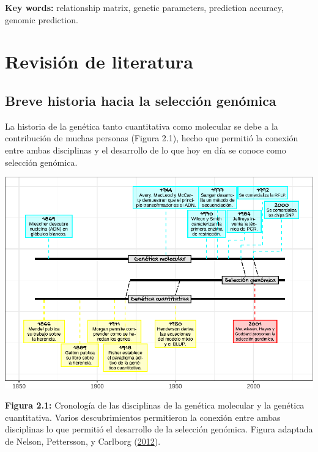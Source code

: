 \documentclass[11pt,spanish,a4paper,oneside,]{book} %
\begin{document}
\hspace*{1em}

\noindent 
\textbf{Key words:} relationship matrix, genetic parameters, prediction accuracy, genomic prediction.

\newpage

\hypertarget{revisiuxf3n-de-literatura}{%
\chapter{Revisión de literatura}\label{revisiuxf3n-de-literatura}}

\hypertarget{breve-historia-hacia-la-selecciuxf3n-genuxf3mica}{%
\section{Breve historia hacia la selección genómica}\label{breve-historia-hacia-la-selecciuxf3n-genuxf3mica}}

La historia de la genética tanto cuantitativa como molecular se debe a la contribución de muchas personas (Figura 2.1), hecho que permitió la conexión entre ambas disciplinas y el desarrollo de lo que hoy en día se conoce como selección genómica.

\begin{center}\includegraphics[width=1\linewidth]{figures/Crono_2} \end{center}

\noindent 
\textbf{Figura 2.1:} Cronología de las disciplinas de la genética molecular y la genética cuantitativa. Varios descubrimientos permitieron la conexión entre ambas disciplinas lo que permitió el desarrollo de la selección genómica. Figura adaptada de Nelson, Pettersson, y Carlborg (\protect\hyperlink{ref-cite:2}{2012}).
\end{document}
